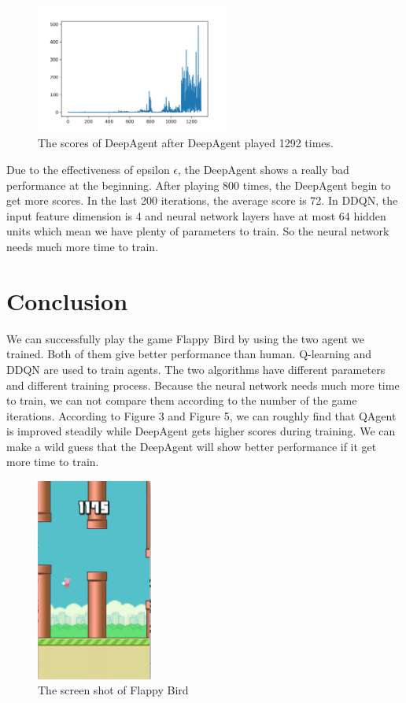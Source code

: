 \documentclass[conference,compsoc]{IEEEtran}
\begin{document}
\begin{figure}[!t]
\centering
\includegraphics[width=2.5in]{DDQN_result.png}
\caption{The scores of DeepAgent after DeepAgent played 1292 times.}
\label{fig5}
\end{figure}


Due to the effectiveness of epsilon ${\epsilon}$, the DeepAgent shows a really bad performance at the beginning. After playing 800 times, the DeepAgent begin to get more scores. In the last 200 iterations,  the average score is 72. In DDQN, the input feature dimension is 4 and neural network layers have at most 64 hidden units which mean we have plenty of parameters to train. So the neural network needs much more time to train.



\section{Conclusion}

We can successfully play the game Flappy Bird by using the two agent we trained. Both of them give better performance than human. Q-learning and DDQN are used to train agents. The two algorithms have different parameters and different training process.  Because the neural network needs much more time to train, we can not compare them according to the number of the game iterations. According to Figure 3 and Figure 5, we can roughly find that QAgent is improved steadily while DeepAgent gets higher scores during training. We can make a wild guess that the DeepAgent will show better performance if it get more time to train.
\begin{figure}[!t]
\centering
\includegraphics[width=1.5in]{f3}
\caption{The screen shot of Flappy Bird}
\label{fig_7}
\end{figure}
\end{document}
